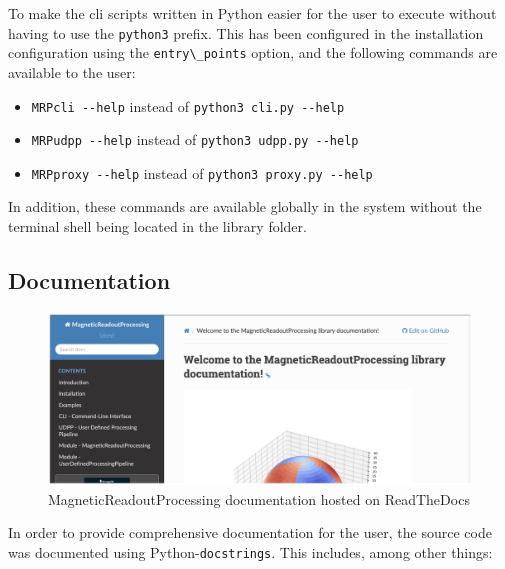 To make the \gls{cli} scripts written in Python easier for the user to
execute without having to use the \passthrough{\lstinline!python3!}
prefix. This has been configured in the installation configuration using
the \passthrough{\lstinline!entry\_points!} option, and the following
commands are available to the user:

\begin{itemize}
\tightlist
\item
  \passthrough{\lstinline!MRPcli --help!} instead of
  \passthrough{\lstinline!python3 cli.py --help!}
\item
  \passthrough{\lstinline!MRPudpp --help!} instead of
  \passthrough{\lstinline!python3 udpp.py --help!}
\item
  \passthrough{\lstinline!MRPproxy --help!} instead of
  \passthrough{\lstinline!python3 proxy.py --help!}
\end{itemize}

In addition, these commands are available globally in the system without
the terminal shell being located in the library folder.

\hypertarget{documentation}{%
\subsection{Documentation}\label{documentation}}

\begin{figure}
\centering
\includegraphics{./generated_images/border_MagneticReadoutProcessing_documentation_hosted_on_ReadTheDocs.png}
\caption{MagneticReadoutProcessing documentation hosted on ReadTheDocs
\label{MagneticReadoutProcessing_documentation_hosted_on_ReadTheDocs.png}}
\end{figure}

In order to provide comprehensive documentation for the user, the source
code was documented using
Python-\passthrough{\lstinline!docstrings!}\cite{PythonDocstringReference}.
This includes, among other things:

